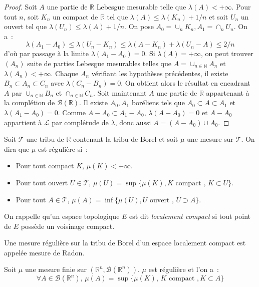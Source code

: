 \begin{proof}
Soit $A$ une partie de $\mathbb{R}$ Lebesgue mesurable telle que
$\lambda(A) < +\infty$. Pour tout $n$, soit $K_n$ un compact de
$\mathbb{R}$ tel que $\lambda(A) \leq \lambda(K_n) + 1/n$ et soit
$U_n$ un ouvert tel que $\lambda(U_n) \leq \lambda(A) + 1/n$. On
pose $A_0 = \cup_n K_n, A_1 = \cap_n U_n$. On a~:
\[
\lambda(A_1-A_0) \leq
\lambda(U_n -K_n) \leq \lambda(A-K_n) + \lambda(U_n-A) \leq 2/n
\]
d'où par passage à la limite $\lambda(A_1 - A_0) = 0$. Si $\lambda(A)
= +\infty$, on peut trouver $(A_n)$ suite de parties Lebesgue
mesurables telles que $A = \cup_{n \in \mathbb{N}} A_n$ et
$\lambda(A_n) < +\infty$. Chaque $A_n$ vérifiant les hypothèses
précédentes, il existe $B_n \subset A_n \subset C_n$ avec
$\lambda(C_n-B_n) = 0$. On obtient alors le résultat en encadrant $A$
par $\cup_{n \in \mathbb{N}} B_n$ et $\cap_{n \in \mathbb{N}} C_n$.
Soit maintenant $A$ une partie de $\mathbb{R}$ appartenant à la
complétion de $\mathcal{B}(\mathbb{R})$. Il existe $A_0, A_1$
boréliens tels que $A_0 \subset A \subset A_1$ et $\lambda(A_1-A_0) =
0$. Comme $A-A_0 \subset A_1 - A_0$, $\lambda(A-A_0) = 0$ et $A-A_0$
appartient à $\mathcal{L}$ par complétude de $\lambda$, donc aussi $A =
(A-A_0) \cup A_0$. 
\end{proof}
\begin{defn}
Soit $\mathcal{T}$ une tribu de $\mathbb{R}$ contenant la
tribu de Borel et soit $\mu$ une mesure sur $\mathcal{T}$. On dira que
$\mu$ est régulière si~:
\begin{itemize}
\item Pour tout compact $K$, $\mu(K) < +\infty$.
\item Pour tout ouvert $U \in \mathcal{T}$, $\mu(U) = \sup \{ \mu(K), K
\mbox{ compact }, \, K \subset U \}$.
\item Pour tout $A \in \mathcal{T}$, $\mu(A) = \inf \{ \mu(U), U
\mbox{ ouvert }, \, U \supset A \}$.
\end{itemize}
\end{defn}
On rappelle qu'un espace topologique $E$ est dit {\em localement
compact} si tout point de $E$ possède un voisinage compact.
\begin{defn}
Une mesure régulière sur la tribu de Borel d'un espace localement
compact est appelée mesure de Radon.
\end{defn}
\begin{prop}
Soit $\mu$ une mesure finie sur $(\mathbb{R}^n, \mathcal{B}(\mathbb{R}^n))$. $\mu$ est régulière et l'on a~:
\[
\forall A \in \mathcal{B}(\mathbb{R}^n), \, \mu(A) = \sup \{
\mu(K), \, K \mbox{ compact }, K \subset A \}
\]
\end{prop}
